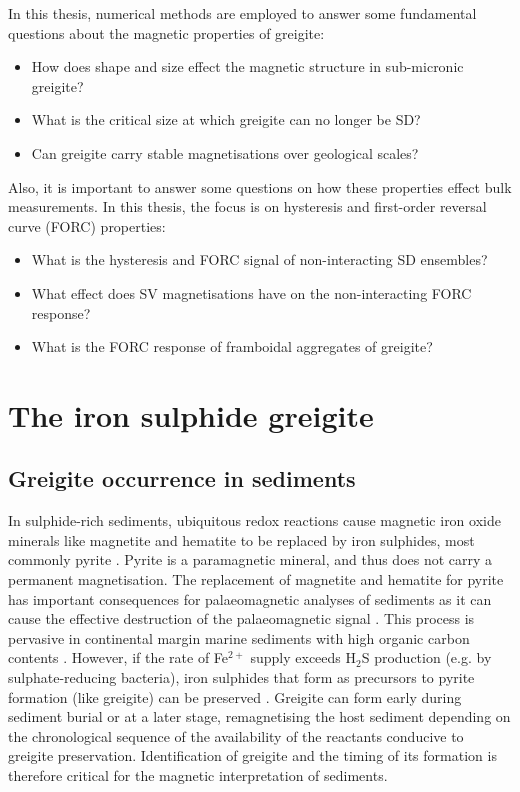 In this thesis, numerical methods are employed to answer some fundamental questions about the magnetic properties of greigite:
\begin{itemize}
\item How does shape and size effect the magnetic structure in sub-micronic greigite?
\item What is the critical size at which greigite can no longer be SD?
\item Can greigite carry stable magnetisations over geological scales?
\end{itemize}
Also, it is important to answer some questions on how these properties effect bulk measurements. In this thesis, the focus is on hysteresis and first-order reversal curve (FORC) \citep{Roberts2000} properties:
\begin{itemize}
\item What is the hysteresis and FORC signal of non-interacting SD ensembles?
\item What effect does SV magnetisations have on the non-interacting FORC response?
\item What is the FORC response of framboidal aggregates of greigite?
\end{itemize}\par

\section{The iron sulphide greigite}
\subsection{Greigite occurrence in sediments}
In sulphide-rich sediments, ubiquitous redox reactions cause magnetic iron oxide minerals like magnetite and hematite to be replaced by iron sulphides, most commonly pyrite \citep{Berner1984}. Pyrite is a paramagnetic mineral, and thus does not carry a permanent magnetisation. The replacement of magnetite and hematite for pyrite has important consequences for palaeomagnetic analyses of sediments as it can cause the effective destruction of the palaeomagnetic signal \citep{Rowan2009}. This process is pervasive in continental margin marine sediments with high organic carbon contents \citep{Roberts2015}. However, if the rate of Fe$^{2{+}}$ supply exceeds H$_2$S production (e.g. by sulphate-reducing bacteria), iron sulphides that form as precursors to pyrite formation (like greigite) can be preserved \citep{Berner1984}. Greigite can form early during sediment burial \citep{Reynolds1999} or at a later stage, remagnetising the host sediment \citep{Roberts2005} depending on the chronological sequence of the availability of the reactants conducive to greigite preservation. Identification of greigite and the timing of its formation is therefore critical for the magnetic interpretation of sediments.\par


